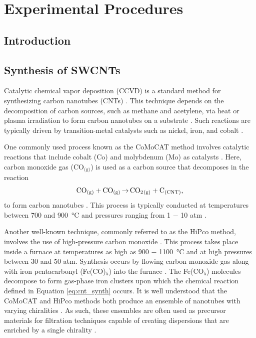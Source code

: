 \chapter{Experimental Procedures}


\section{Introduction}

\section{Synthesis of SWCNTs}
\label{section:cnt_synthesis}
Catalytic chemical vapor deposition (CCVD) is a standard method for synthesizing carbon nanotubes (CNTs) \cite{prasek2011methods, agboola2007conceptual}. This technique depends on the decomposition of carbon sources, such as methane and acetylene, via heat or plasma irradiation to form carbon nanotubes on a substrate \cite{agboola2007conceptual}. Such reactions are typically driven by transition-metal catalysts such as nickel, iron, and cobalt \cite{prasek2011methods}.

One commonly used process known as the CoMoCAT method involves catalytic reactions that include cobalt (Co) and molybdenum (Mo) as catalysts \cite{resasco2002scalable}. Here, carbon monoxide gas (CO$_\text{(g)}$) is used as a carbon source that decomposes in the reaction
\vspace{-2mm}
\begin{equation}
\label{eq:cnt_synth}
\ce{CO_{(g)} + CO_{(g)} $\rightarrow$ CO_2_{\text{(g)}} + C_{(CNT)}},
\end{equation}
to form carbon nanotubes \cite{resasco2002scalable}. This process is typically conducted at temperatures between 700 and \SI{900}{\celsius} and pressures ranging from 1 $-$ 10 atm \cite{resasco2002scalable}.

Another well-known technique, commonly referred to as the HiPco method, involves the use of high-pressure carbon monoxide \cite{bronikowski2001gas, nikolaev1999gas}. This process takes place inside a furnace at temperatures as high as 900 $-$ \SI{1100}{\celsius} and at high pressures between 30 and 50 atm. Synthesis occurs by flowing carbon monoxide gas along with iron pentacarbonyl (Fe(CO)$_5$) into the furnace \cite{nikolaev1999gas}. The Fe(CO$_5$) molecules decompose to form gas-phase iron clusters upon which the chemical reaction defined in Equation \eqref{eq:cnt_synth} occurs. It is well understood that the CoMoCAT and HiPco methods both produce an ensemble of nanotubes with varying chiralities \cite{agboola2007conceptual}. As such, these ensembles are often used as precursor materials for filtration techniques capable of creating dispersions that are enriched by a single chirality \cite{janas2018towards, zheng2019sorting}.

